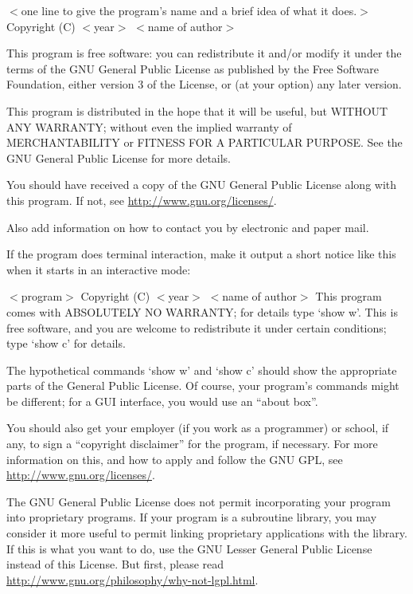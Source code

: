 $<$one line to give the program's name and a brief idea of what it
does.$>$ Copyright (C) $<$year$>$  $<$name of author$>$

This program is free software: you can redistribute it and/or
modify it under the terms of the GNU General Public License as published by
    the Free Software Foundation, either version 3 of the License, or
    (at your option) any later version.

This program is distributed in the hope that it will be useful,
    but WITHOUT ANY WARRANTY; without even the implied warranty of
    MERCHANTABILITY or FITNESS FOR A PARTICULAR PURPOSE.  See the
    GNU General Public License for more details.

You should have received a copy of the GNU General Public License
    along with this program.  If not, see \url{http://www.gnu.org/licenses/}.

Also add information on how to contact you by electronic and paper mail.

  If the program does terminal interaction, make it output a short
notice like this when it starts in an interactive mode:

$<$program$>$  Copyright (C) $<$year$>$  $<$name of author$>$
    This program comes with ABSOLUTELY NO WARRANTY; for details type `show w'.
    This is free software, and you are welcome to redistribute it
    under certain conditions; type `show c' for details.

The hypothetical commands `show w' and `show c' should show the appropriate
parts of the General Public License.  Of course, your program's commands
might be different; for a GUI interface, you would use an ``about box''.

You should also get your employer (if you work as a programmer) or school,
if any, to sign a ``copyright disclaimer'' for the program, if necessary.
For more information on this, and how to apply and follow the GNU GPL, see
\url{http://www.gnu.org/licenses/}.


The GNU General Public License does not permit incorporating your program into
proprietary programs.  If your program is a subroutine library, you may
consider it more useful to permit linking proprietary applications with
the library.  If this is what you want to do, use the GNU Lesser General Public
License instead of this License.  But first, please read
\url{http://www.gnu.org/philosophy/why-not-lgpl.html}.
